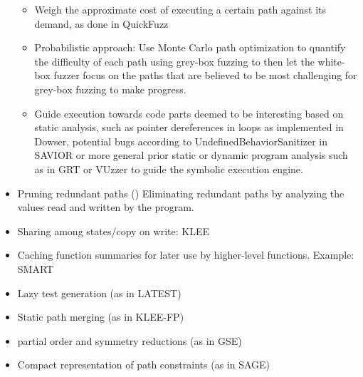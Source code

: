 \documentclass{article}
\begin{document}
\begin{multicols}{2}
\begin{itemize}
\begin{itemize}
                  \item Weigh the approximate cost of executing a certain path against its demand, as done in QuickFuzz\cite{QuickFuzz}
                  \item Probabilistic approach: Use Monte Carlo path optimization to quantify the difficulty of each path using grey-box fuzzing to then let the white-box fuzzer focus on the paths that are believed to be most challenging for grey-box fuzzing to make progress.\cite{DigFuzz}
                  \item Guide execution towards code parts deemed to be interesting based on static analysis, such as pointer dereferences in loops as implemented in Dowser\cite{Dowser}, potential bugs according to UndefinedBehaviorSanitizer\cite{UndefinedBehaviorSanitizer} in SAVIOR\cite{SAVIOR} or more general prior static or dynamic program analysis such as in GRT\cite{GRT} or VUzzer\cite{VUzzer} to guide the symbolic execution engine.
              \end{itemize}
        \item Pruning redundant paths (\cite{RWset}) Eliminating redundant paths by analyzing the values read and written by the program.
        \item Sharing among states/copy on write: KLEE\cite{KLEE}
        \item Caching function summaries for later use by higher-level functions. Example: SMART\cite{SMART}
        \item Lazy test generation (as in LATEST\cite{LATEST})
        \item Static path merging (as in KLEE-FP\cite{KLEEFP})
        \item partial order and symmetry reductions (as in GSE\cite{GSE})
        \item Compact representation of path constraints (as in SAGE\cite{SAGE})
    \end{itemize}


\end{multicols}
\end{document}
